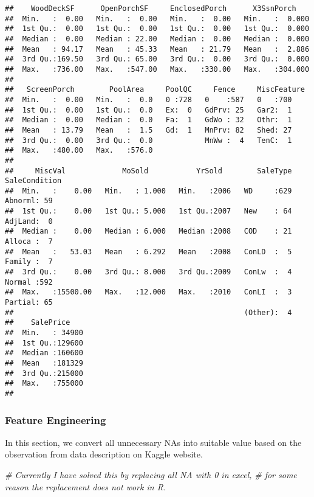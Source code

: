 \documentclass[]{article}
\newenvironment{Shaded}{\begin{snugshade}}{\end{snugshade}}
\newcommand{\CommentTok}[1]{\textcolor[rgb]{0.56,0.35,0.01}{\textit{{#1}}}}
\begin{document}
\begin{verbatim}
##    WoodDeckSF      OpenPorchSF     EnclosedPorch      X3SsnPorch     
##  Min.   :  0.00   Min.   :  0.00   Min.   :  0.00   Min.   :  0.000  
##  1st Qu.:  0.00   1st Qu.:  0.00   1st Qu.:  0.00   1st Qu.:  0.000  
##  Median :  0.00   Median : 22.00   Median :  0.00   Median :  0.000  
##  Mean   : 94.17   Mean   : 45.33   Mean   : 21.79   Mean   :  2.886  
##  3rd Qu.:169.50   3rd Qu.: 65.00   3rd Qu.:  0.00   3rd Qu.:  0.000  
##  Max.   :736.00   Max.   :547.00   Max.   :330.00   Max.   :304.000  
##                                                                      
##   ScreenPorch        PoolArea     PoolQC     Fence     MiscFeature
##  Min.   :  0.00   Min.   :  0.0   0 :728   0    :587   0   :700   
##  1st Qu.:  0.00   1st Qu.:  0.0   Ex:  0   GdPrv: 25   Gar2:  1   
##  Median :  0.00   Median :  0.0   Fa:  1   GdWo : 32   Othr:  1   
##  Mean   : 13.79   Mean   :  1.5   Gd:  1   MnPrv: 82   Shed: 27   
##  3rd Qu.:  0.00   3rd Qu.:  0.0            MnWw :  4   TenC:  1   
##  Max.   :480.00   Max.   :576.0                                   
##                                                                   
##     MiscVal             MoSold           YrSold        SaleType   SaleCondition
##  Min.   :    0.00   Min.   : 1.000   Min.   :2006   WD     :629   Abnorml: 59  
##  1st Qu.:    0.00   1st Qu.: 5.000   1st Qu.:2007   New    : 64   AdjLand:  0  
##  Median :    0.00   Median : 6.000   Median :2008   COD    : 21   Alloca :  7  
##  Mean   :   53.03   Mean   : 6.292   Mean   :2008   ConLD  :  5   Family :  7  
##  3rd Qu.:    0.00   3rd Qu.: 8.000   3rd Qu.:2009   ConLw  :  4   Normal :592  
##  Max.   :15500.00   Max.   :12.000   Max.   :2010   ConLI  :  3   Partial: 65  
##                                                     (Other):  4                
##    SalePrice     
##  Min.   : 34900  
##  1st Qu.:129600  
##  Median :160600  
##  Mean   :181329  
##  3rd Qu.:215000  
##  Max.   :755000  
## 
\end{verbatim}

\subsubsection{Feature Engineering}\label{feature-engineering}

In this section, we convert all unnecessary NAs into suitable value
based on the observation from data description on Kaggle website.

\begin{Shaded}
\begin{Highlighting}[]
\CommentTok{# Currently I have solved this by replacing all NA with 0 in excel,}
\CommentTok{# for some reason the replacement does not work in R. }
\end{Highlighting}
\end{Shaded}
\end{document}
